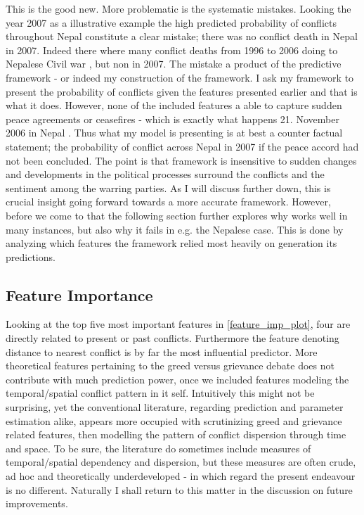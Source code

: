 \documentclass[a4paper]{article}
\begin{document}
This is the good new. More problematic is the systematic mistakes. Looking the year 2007 as a illustrative example the high predicted probability of conflicts throughout Nepal constitute a clear mistake; there was no conflict death in Nepal in 2007. Indeed there where many conflict deaths from 1996 to 2006 doing to Nepalese Civil war \citep{ohchr2012nepal}, but non in 2007. The mistake a product of the predictive framework - or indeed my construction of the framework. I ask my framework to present the probability of conflicts given the features presented earlier and that is what it does. However, none of the included features a able to capture sudden peace agreements or ceasefires - which is exactly what happens 21. November 2006 in Nepal \citep{ohchr2012nepal}. Thus what my model is presenting is at best a counter factual statement; the probability of conflict across Nepal in 2007 if the peace accord had not been concluded. The point is that framework is insensitive to sudden changes and developments in the political processes surround the conflicts and the sentiment among the warring parties. As I will discuss further down, this is crucial insight going forward towards a more accurate framework. However, before we come to that the following section further explores why works well in many instances, but also why it fails in e.g. the Nepalese case. This is done by analyzing which features the framework relied most heavily on generation its predictions.\par

\subsection{Feature Importance}

Looking at the top five most important features in \autoref{feature_imp_plot}, four are directly related to present or past conflicts. Furthermore the feature denoting distance to nearest conflict is by far the most influential predictor. More theoretical features pertaining to the greed versus grievance debate does not contribute with much prediction power, once we included features modeling the temporal/spatial conflict pattern in it self. Intuitively this might not be surprising, yet the conventional literature, regarding prediction and parameter estimation alike, appears more occupied with scrutinizing greed and grievance related features, then modelling the pattern of conflict dispersion through time and space. To be sure, the literature do sometimes include measures of temporal/spatial dependency and dispersion, but these measures are often crude, ad hoc and theoretically underdeveloped - in which regard the present endeavour is no different. Naturally I shall return to this matter in the discussion on future improvements.\par
\end{document}
